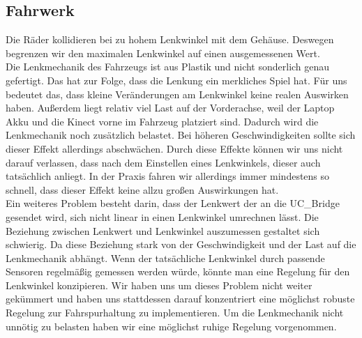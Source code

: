 \subsection{Fahrwerk}
\label{sec:fahrwerk}
Die Räder kollidieren bei zu hohem Lenkwinkel mit dem Gehäuse.
Deswegen begrenzen wir den maximalen Lenkwinkel auf einen ausgemessenen Wert.
\\
Die Lenkmechanik des Fahrzeugs ist aus Plastik und nicht sonderlich genau gefertigt.
Das hat zur Folge, dass die Lenkung ein merkliches Spiel hat. 
Für uns bedeutet das, dass kleine Veränderungen am Lenkwinkel keine realen Auswirken haben. 
Außerdem liegt relativ viel Last auf der Vorderachse, weil der Laptop Akku und die Kinect vorne im Fahrzeug platziert sind.
Dadurch wird die Lenkmechanik noch zusätzlich belastet.
Bei höheren Geschwindigkeiten sollte sich dieser Effekt allerdings abschwächen. 
Durch diese Effekte können wir uns nicht darauf verlassen, dass nach dem Einstellen eines Lenkwinkels, dieser auch tatsächlich anliegt.
In der Praxis fahren wir allerdings immer mindestens so schnell, dass dieser Effekt keine allzu großen Auswirkungen hat.
\\
Ein weiteres Problem besteht darin, dass der Lenkwert der an die UC\_Bridge gesendet wird, sich nicht linear in einen Lenkwinkel umrechnen lässt.
Die Beziehung zwischen Lenkwert und Lenkwinkel auszumessen gestaltet sich schwierig.
Da diese Beziehung stark von der Geschwindigkeit und der Last auf die Lenkmechanik abhängt.
Wenn der tatsächliche Lenkwinkel durch passende Sensoren regelmäßig gemessen werden würde, könnte man eine Regelung für den Lenkwinkel konzipieren.
Wir haben uns um dieses Problem nicht weiter gekümmert und haben uns stattdessen darauf konzentriert eine möglichst robuste Regelung zur Fahrspurhaltung zu implementieren.
Um die Lenkmechanik nicht unnötig zu belasten haben wir eine möglichst ruhige Regelung vorgenommen.




